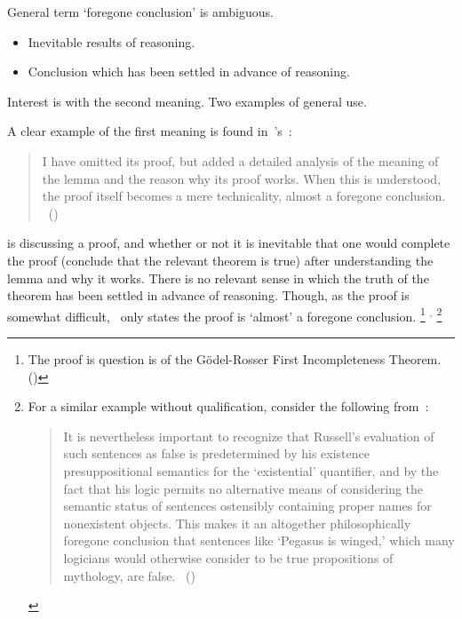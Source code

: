 \begin{note}
  General term `foregone conclusion' is ambiguous.
  \begin{itemize}
    \item
    Inevitable results of reasoning.
  \item
    Conclusion which has been settled in advance of reasoning.
  \end{itemize}

  Interest is with the second meaning.
  Two examples of general use.

  A clear example of the first meaning is found in~\citeauthor{Machover:1996vu}'s~:

  \begin{quote}
    I have omitted its proof, but added a detailed analysis of the meaning of the lemma and the reason why its proof works. When this is understood, the proof itself becomes a mere technicality, almost a foregone conclusion.%
    \mbox{ }\hfill\mbox{(\citeyear[viii]{Machover:1996vu})}
  \end{quote}

  \citeauthor{Machover:1996vu} is discussing a proof, and whether or not it is inevitable that one would complete the proof (conclude that the relevant theorem is true) after understanding the lemma and why it works.
  There is no relevant sense in which the truth of the theorem has been settled in advance of reasoning.
  Though, as the proof is somewhat difficult,~\citeauthor{Machover:1996vu} only states the proof is `almost' a foregone conclusion.%
  \footnote{
    The proof is question is of the G\"{o}del-Rosser First Incompleteness Theorem.
    (\citeyear[Cf.][226]{Machover:1996vu})
  }%
  \(^{,}\)%
  \footnote{
    For a similar example without qualification, consider the following from~\textcite{Jacquette:2002up}:
    \begin{quote}
    It is nevertheless important to recognize that Russell's evaluation of such sentences as false is predetermined by his existence presuppositional semantics for the ‘existential' quantifier, and by the fact that his logic permits no alternative means of considering the semantic status of sentences ostensibly containing proper names for nonexistent objects.
    This makes it an altogether philosophically foregone conclusion that sentences like ‘Pegasus is winged,' which many logicians would otherwise consider to be true propositions of mythology, are false.%
    \mbox{ }\hfill\mbox{(\citeyear[6]{Jacquette:2002up})}
  \end{quote}
  }


\end{note}
